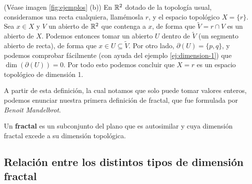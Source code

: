 \begin{ejemplo}
(Véase imagen \ref{fig:ejemplos} (b))
En $\mathbb{R}^2$ dotado de la topología usual, consideramos una recta cualquiera, llamémosla $r$, y el espacio topológico $X=\{r\}$. Sea $x\in X$ y $V$ un abierto de $\mathbb{R}^2$ que contenga a $x$, de forma que $\tilde{V} = r\cap V$ es un abierto de $X$. Podemos entonces tomar un abierto $U$ dentro de $\tilde{V}$ (un segmento abierto de recta), de forma que $x\in U\subseteq \tilde{V}$. Por otro lado, $\partial(U)=\{p,q\}$, y podemos comprobar fácilmente (con ayuda del ejemplo \ref{ej:dimension-1}) que $\dim(\partial(U))=0$. Por todo esto podemos concluir que $X=r$ es un espacio topológico de dimensión 1. 
\end{ejemplo}

A partir de esta definición, la cual notamos que solo puede tomar valores enteros, podemos enunciar nuestra primera definición de fractal, que fue formulada por \textit{Benoit Mandelbrot}.

\begin{definicion}[Fractal]
\label{def:fractal}
Un \textbf{fractal} es un subconjunto del plano que es autosimilar y cuya dimensión fractal excede a su dimensión topológica.
\end{definicion}

\subsection{Relación entre los distintos tipos de dimensión fractal} 

